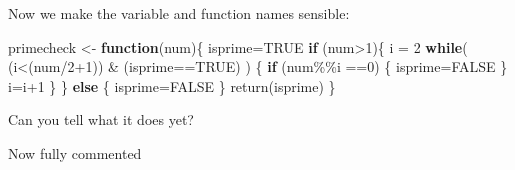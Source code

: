 \documentclass[
]{book}
\newenvironment{Shaded}{\begin{snugshade}}{\end{snugshade}}
\newcommand{\ConstantTok}[1]{\textcolor[rgb]{0.00,0.00,0.00}{#1}}
\newcommand{\ControlFlowTok}[1]{\textcolor[rgb]{0.13,0.29,0.53}{\textbf{#1}}}
\newcommand{\DecValTok}[1]{\textcolor[rgb]{0.00,0.00,0.81}{#1}}
\newcommand{\FunctionTok}[1]{\textcolor[rgb]{0.00,0.00,0.00}{#1}}
\newcommand{\NormalTok}[1]{#1}
\newcommand{\OtherTok}[1]{\textcolor[rgb]{0.56,0.35,0.01}{#1}}
\newcommand{\SpecialCharTok}[1]{\textcolor[rgb]{0.00,0.00,0.00}{#1}}
\begin{document}
Now we make the variable and function names sensible:

\begin{Shaded}
\begin{Highlighting}[]
\NormalTok{primecheck }\OtherTok{\textless{}{-}} \ControlFlowTok{function}\NormalTok{(num)\{}
\NormalTok{  isprime}\OtherTok{=}\ConstantTok{TRUE}
  \ControlFlowTok{if}\NormalTok{ (num}\SpecialCharTok{\textgreater{}}\DecValTok{1}\NormalTok{)\{ }
\NormalTok{    i }\OtherTok{=} \DecValTok{2} 
      \ControlFlowTok{while}\NormalTok{( (i}\SpecialCharTok{\textless{}}\NormalTok{(num}\SpecialCharTok{/}\DecValTok{2}\SpecialCharTok{+}\DecValTok{1}\NormalTok{)) }\SpecialCharTok{\&}\NormalTok{ (isprime}\SpecialCharTok{==}\ConstantTok{TRUE}\NormalTok{) ) \{}
        \ControlFlowTok{if}\NormalTok{ (num}\SpecialCharTok{\%\%}\NormalTok{i }\SpecialCharTok{==}\DecValTok{0}\NormalTok{) \{}
\NormalTok{          isprime}\OtherTok{=}\ConstantTok{FALSE}
\NormalTok{        \}}
\NormalTok{        i}\OtherTok{=}\NormalTok{i}\SpecialCharTok{+}\DecValTok{1}
\NormalTok{      \}}
\NormalTok{  \} }\ControlFlowTok{else}\NormalTok{ \{}
\NormalTok{    isprime}\OtherTok{=}\ConstantTok{FALSE}
\NormalTok{  \}}
  \FunctionTok{return}\NormalTok{(isprime)}
\NormalTok{\}}
\end{Highlighting}
\end{Shaded}

Can you tell what it does yet?

Now fully commented
\end{document}
